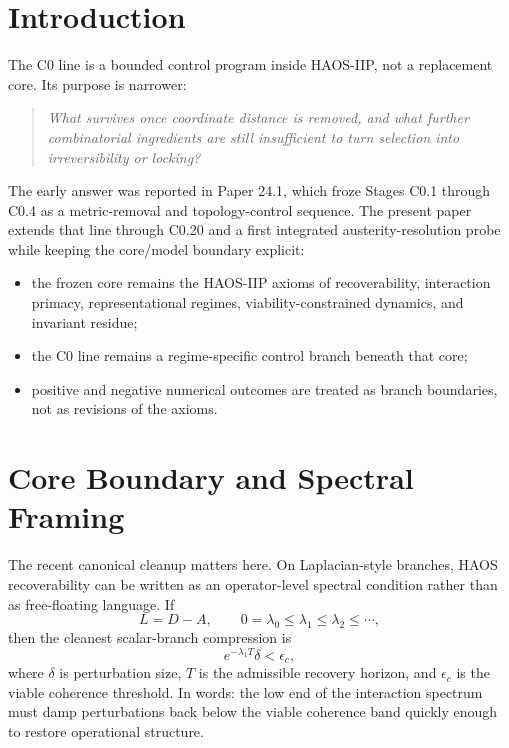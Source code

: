 \documentclass[11pt]{article}
\begin{document}
\begin{abstract}
topology locking or a family-wide structuralization of harmonic address on the no-distance branch.
\end{abstract}

\section{Introduction}

The C0 line is a bounded control program inside HAOS-IIP, not a replacement core. Its purpose is narrower:
\begin{quote}
\emph{What survives once coordinate distance is removed, and what further combinatorial ingredients are still insufficient to turn selection into irreversibility or locking?}
\end{quote}

The early answer was reported in Paper 24.1, which froze Stages C0.1 through C0.4 as a metric-removal and topology-control sequence. The present paper extends that line through C0.20 and a first integrated austerity-resolution probe while keeping the core/model boundary explicit:
\begin{itemize}
\item the frozen core remains the HAOS-IIP axioms of recoverability, interaction primacy, representational regimes, viability-constrained dynamics, and invariant residue;
\item the C0 line remains a regime-specific control branch beneath that core;
\item positive and negative numerical outcomes are treated as branch boundaries, not as revisions of the axioms.
\end{itemize}

\section{Core Boundary and Spectral Framing}

The recent canonical cleanup matters here. On Laplacian-style branches, HAOS recoverability can be written as an operator-level spectral condition rather than as free-floating language. If
\[
L = D-A, \qquad 0=\lambda_0 \le \lambda_1 \le \lambda_2 \le \cdots,
\]
then the cleanest scalar-branch compression is
\[
e^{-\lambda_1 T}\delta < \epsilon_c,
\]
where $\delta$ is perturbation size, $T$ is the admissible recovery horizon, and $\epsilon_c$ is the viable coherence threshold. In words: the low end of the interaction spectrum must damp perturbations back below the viable coherence band quickly enough to restore operational structure.
\end{document}
